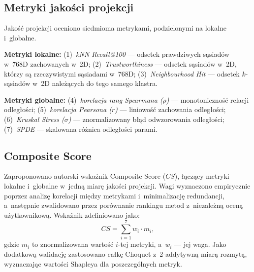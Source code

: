 \documentclass[a4paper,11pt,twocolumn]{article}
\begin{document}
\subsection{Metryki jakości projekcji}

Jakość projekcji oceniono siedmioma metrykami, podzielonymi na lokalne
i~globalne.

\textbf{Metryki lokalne:}
(1)~\emph{kNN Recall@100} --- odsetek prawdziwych sąsiadów w~768D
zachowanych w~2D;
(2)~\emph{Trustworthiness} --- odsetek sąsiadów w~2D, którzy są
rzeczywistymi sąsiadami w~768D;
(3)~\emph{Neighbourhood Hit} --- odsetek $k$-sąsiadów w~2D
należących do tego samego klastra.

\textbf{Metryki globalne:}
(4)~\emph{korelacja rang Spearmana ($\rho$)} --- monotoniczność relacji
odległości;
(5)~\emph{korelacja Pearsona ($r$)} --- liniowość zachowania odległości;
(6)~\emph{Kruskal Stress ($\sigma$)} --- znormalizowany błąd
odwzorowania odległości;
(7)~\emph{SPDE} --- skalowana różnica odległości parami.

\subsection{Composite Score}

Zaproponowano autorski wskaźnik Composite Score ($CS$), łączący metryki
lokalne i~globalne w~jedną miarę jakości projekcji. Wagi wyznaczono
empirycznie poprzez analizę korelacji między metrykami i~minimalizację
redundancji, a~następnie zwalidowano przez porównanie rankingu metod
z~niezależną oceną użytkownikową. Wskaźnik zdefiniowano jako:
\begin{equation}
  CS = \sum_{i=1}^{7} w_i \cdot m_i,
  \label{eq:composite}
\end{equation}
gdzie $m_i$ to znormalizowana wartość $i$-tej metryki, a~$w_i$ ---
jej waga. Jako dodatkową walidację zastosowano całkę Choquet
z~2-addytywną miarą rozmytą, wyznaczając wartości Shapleya dla
poszczególnych metryk.


\end{document}
